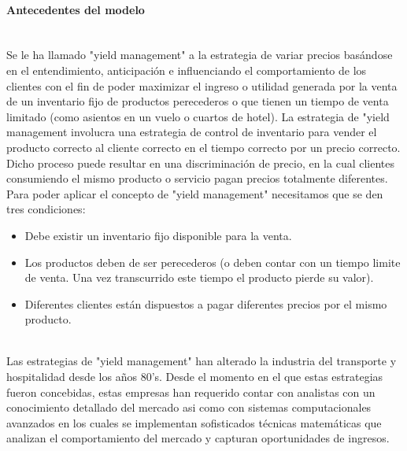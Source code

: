 \documentclass{article}\usepackage[]{graphicx}\usepackage[]{color}
\begin{document}
\paragraph{Antecedentes del modelo} ~\\
Se le ha llamado "yield management" a la estrategia de variar precios basándose en el entendimiento, anticipación e influenciando el comportamiento de los clientes con el fin de poder maximizar el ingreso o utilidad generada por la venta de un inventario fijo de productos perecederos o que tienen un tiempo de venta limitado (como asientos en un vuelo o cuartos de hotel). La estrategia de "yield management involucra una estrategia de control de inventario para vender el producto correcto al cliente correcto en el tiempo correcto por un precio correcto. Dicho proceso puede resultar en una discriminación de precio, en la cual clientes consumiendo el mismo producto o servicio pagan precios totalmente diferentes. 
~\\
Para poder aplicar el concepto de "yield management" necesitamos que se den tres condiciones:
\begin{itemize}[noitemsep]
\item Debe existir un inventario fijo disponible para la venta.
\item Los productos deben de ser perecederos (o deben contar con un tiempo limite de venta. Una vez transcurrido este tiempo el producto pierde su valor).
\item Diferentes clientes están dispuestos a pagar diferentes precios por el mismo producto.
\end{itemize}
~\\
Las estrategias de "yield management" han alterado la industria del transporte y hospitalidad desde los años 80's. Desde el momento en el que estas estrategias fueron concebidas, estas empresas han requerido contar con analistas con un conocimiento detallado del mercado asi como con sistemas computacionales avanzados en los cuales se implementan sofisticados técnicas matemáticas que analizan el comportamiento del mercado y capturan oportunidades de ingresos.
~\\
\end{document}
